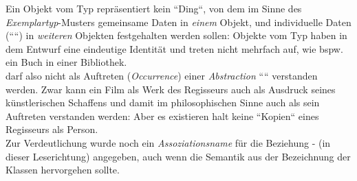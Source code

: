 \noindent
Ein Objekt vom Typ  repräsentiert kein ``Ding``, von dem im Sinne des \textit{Exemplartyp}-Musters gemeinsame Daten in \textit{einem} Objekt, und individuelle Daten (````) in \textit{weiteren} Objekten festgehalten werden sollen: Objekte vom Typ  haben in dem Entwurf eine eindeutige Identität und treten nicht mehrfach auf, wie {bspw.} ein Buch in einer Bibliothek.\\

\noindent
{} darf also nicht als Auftreten (\textit{Occurrence}) einer \textit{Abstraction} ```` verstanden werden. Zwar kann ein Film als Werk des Regisseurs auch als Ausdruck seines künstlerischen Schaffens und damit im philosophischen Sinne auch als sein Auftreten verstanden werden: Aber es existieren halt keine ``Kopien`` eines Regisseurs als Person. \\

\noindent
Zur Verdeutlichung wurde noch ein \textit{Assoziationsname} für die Beziehung  -  (in dieser Leserichtung) angegeben, auch wenn die Semantik aus der Bezeichnung der Klassen hervorgehen sollte.